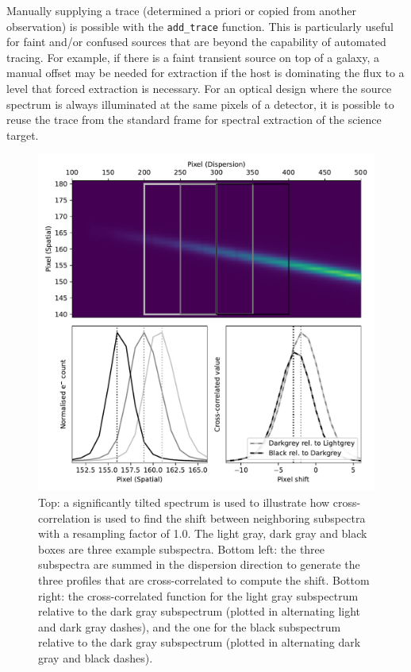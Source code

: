 \documentclass[linenumbers, twocolumn]{aastex631}
\begin{document}
Manually supplying a trace (determined a priori or copied from another observation) is possible with the \texttt{add\_trace}
function. This is particularly useful for faint and/or confused
sources that are beyond the capability of automated tracing. For
example, if there is a faint transient source on top of a galaxy,
a manual offset may be needed for extraction if the host is
dominating the flux to a level that forced extraction is necessary.
For an optical design where the source spectrum is always illuminated
at the same pixels of a detector, it is possible to reuse the trace
from the standard frame for spectral extraction of the science target.

\begin{figure}
    \centering
    \includegraphics[width=\columnwidth]{fig_01_tracing.pdf}
    \caption{Top: a significantly tilted spectrum is used to illustrate how
    cross-correlation is used to find the shift between neighboring
    subspectra with a resampling factor of 1.0. The light gray, dark
    gray and black boxes are three example subspectra. Bottom left: the
    three subspectra are summed in the dispersion direction to generate
    the three profiles that are cross-correlated to compute the shift.
    Bottom right: the cross-correlated function for the light gray
    subspectrum relative to the dark gray subspectrum (plotted in
    alternating light and dark gray dashes), and the one for the black
    subspectrum relative to the dark gray subspectrum (plotted in
    alternating dark gray and black dashes).}
    \label{fig:trace}
\end{figure}
\end{document}
